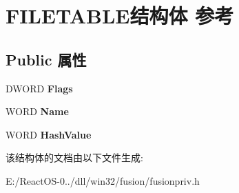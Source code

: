 \hypertarget{struct_f_i_l_e_t_a_b_l_e}{}\section{F\+I\+L\+E\+T\+A\+B\+L\+E结构体 参考}
\label{struct_f_i_l_e_t_a_b_l_e}
\subsection*{Public 属性}
\begin{DoxyCompactItemize}
\item 
\mbox{\label{struct_f_i_l_e_t_a_b_l_e_ae03c6f0a02da6e3eb91710a5c4ba35aa}} 
D\+W\+O\+RD {\bfseries Flags}
\item 
\mbox{\label{struct_f_i_l_e_t_a_b_l_e_a4c191803dfcec1bcc38669fae4c3c452}} 
W\+O\+RD {\bfseries Name}
\item 
\mbox{\label{struct_f_i_l_e_t_a_b_l_e_aae2f650e701cfb3691c151daab26b252}} 
W\+O\+RD {\bfseries Hash\+Value}
\end{DoxyCompactItemize}


该结构体的文档由以下文件生成\+:\begin{DoxyCompactItemize}
\item 
E\+:/\+React\+O\+S-\/0../dll/win32/fusion/fusionpriv.\+h\end{DoxyCompactItemize}
